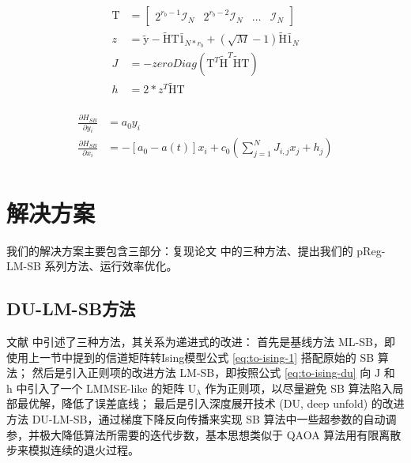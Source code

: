 \documentclass[withoutpreface,bwprint]{cumcmthesis}
\begin{document}
\begin{equation}
\begin{split}
\mathrm T &= \begin{bmatrix}
   2^{r_b-1} \mathcal I_N & 2^{r_b-2} \mathcal I_N & \dots & \mathcal I_N
\end{bmatrix} \\
z &= \tilde{\mathrm y} - \tilde{\mathrm H} \mathrm T \bar{1}_{N*r_b} + (\sqrt M - 1) \tilde{\mathrm H} \bar{1}_N \\
J &= -zeroDiag(\mathrm T^T \tilde{\mathrm H}^T \tilde{\mathrm H} \mathrm T) \\
h &= 2 * z^T \tilde{\mathrm H} \mathrm T \\
\end{split}
\label{eq:to-ising-1}
\end{equation}

\begin{equation}
\begin{split}
\frac{\partial H_{SB}}{\partial y_i} &= a_0 y_i \\
\frac{\partial H_{SB}}{\partial x_i} &= -[a_0 - a(t)] x_i + c_0 (\sum\limits_{j=1}^N J_{i,j} x_j + h_j) \\
\end{split}
\label{eq:sb}
\end{equation}


\section{解决方案}

我们的解决方案主要包含三部分：复现论文 \cite{Takabe2023} 中的三种方法、提出我们的 pReg-LM-SB 系列方法、运行效率优化。

\subsection{DU-LM-SB方法}

文献 \cite{Takabe2023} 中引述了三种方法，其关系为递进式的改进：
首先是基线方法 ML-SB，即使用上一节中提到的信道矩阵转Ising模型公式 \ref{eq:to-ising-1} 搭配原始的 SB 算法；
然后是引入正则项的改进方法 LM-SB，即按照公式 \ref{eq:to-ising-du} 向 $ \mathrm{J} $ 和 $ \mathrm{h} $ 中引入了一个 LMMSE-like 的矩阵 $ \mathrm U_\lambda $ 作为正则项，以尽量避免 SB 算法陷入局部最优解，降低了误差底线；
最后是引入深度展开技术 (DU, deep unfold) 的改进方法 DU-LM-SB，通过梯度下降反向传播来实现 SB 算法中一些超参数的自动调参，并极大降低算法所需要的迭代步数，基本思想类似于 QAOA 算法用有限离散步来模拟连续的退火过程。
\end{document}
